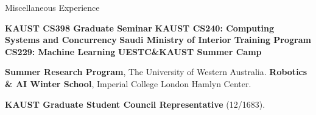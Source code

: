 \begin{rubric}{Miscellaneous Experience}

\entry*[2025 Spring] \textbf{KAUST CS398 Graduate Seminar}
 \textbf{KAUST CS240: Computing Systems and Concurrency}
\entry*[2023 Spring] \textbf{Saudi Ministry of Interior Training Program CS229: Machine Learning}
 \textbf{UESTC\&KAUST Summer Camp}


\entry*[2019 Summer] \textbf{Summer Research Program}, The University of Western Australia.
%
\entry*[2019 Winter] \textbf{Robotics \& AI Winter School}, Imperial College London Hamlyn Center.

\entry*[2024-2025] \textbf{KAUST Graduate Student Council Representative} (12/1683).

\end{rubric}